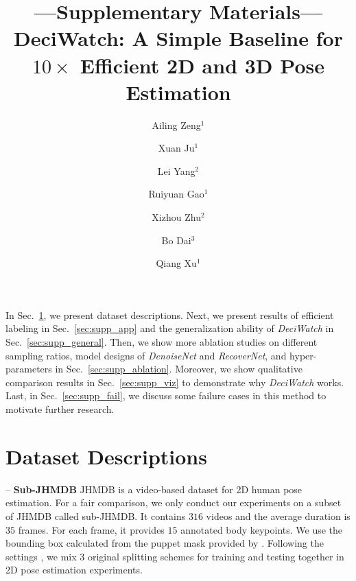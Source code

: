 \documentclass[runningheads]{llncs}
\newcommand{\name}{\emph{DeciWatch}\xspace}
\begin{document}
\pagestyle{headings}
\mainmatter
\def\ECCVSubNumber{1845}  

\title{---Supplementary Materials---\\DeciWatch: A Simple Baseline for $10\times$ Efficient 2D and 3D Pose Estimation} 

\begin{comment}
\titlerunning{ECCV-22 submission ID \ECCVSubNumber} 
\authorrunning{ECCV-22 submission ID \ECCVSubNumber} 
\author{Anonymous ECCV submission}
\institute{Paper ID \ECCVSubNumber}
\end{comment}


\author{Ailing Zeng$^{1}$  \and
Xuan Ju$^{1}$  \and
Lei Yang$^{2}$  \and
Ruiyuan Gao$^{1}$  \and
Xizhou Zhu$^{2}$  \and
Bo Dai$^{3}$  \and
Qiang Xu$^{1}$ 
}
\maketitle

In Sec.~\ref{sec:supp_exp}, we present dataset descriptions. Next, we present results of efficient labeling in Sec.~\ref{sec:supp_app} and the generalization ability of \name in Sec.~\ref{sec:supp_general}. Then, we show more ablation studies on different sampling ratios, model designs of \textit{DenoiseNet} and \textit{RecoverNet}, and hyper-parameters in Sec.~\ref{sec:supp_ablation}. Moreover, we show qualitative comparison results in Sec.~\ref{sec:supp_viz} to demonstrate why \name works. Last, in Sec.~\ref{sec:supp_fail}, we discuss some failure cases in this method to motivate further research.


\section{Dataset Descriptions}
\label{sec:supp_exp}

\noindent -- \textbf{Sub-JHMDB}  JHMDB\cite{jhuang2013towards} is a video-based dataset for 2D human pose estimation. For a fair comparison, we only conduct our experiments on a subset of JHMDB called sub-JHMDB. It contains $316$ videos and the average duration is $35$ frames. For each frame, it provides $15$ annotated body keypoints. We use the bounding box calculated from the puppet mask provided by \cite{luo2018lstm}. Following the settings \cite{zhang2020key,fan2021motion}, we mix $3$ original splitting schemes for training and testing together in 2D pose estimation experiments.
\end{document}
